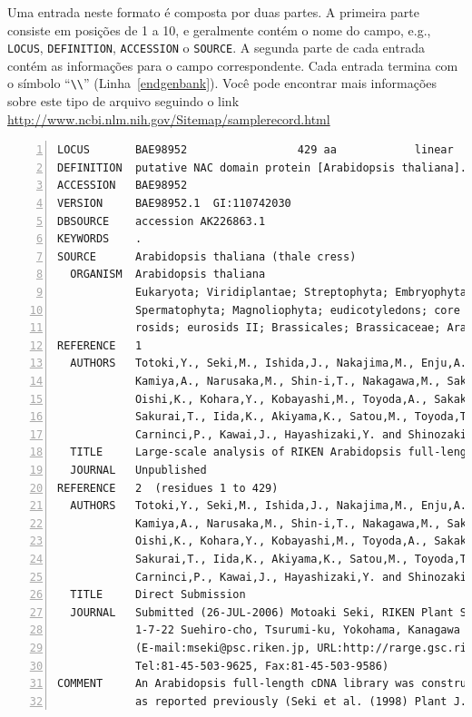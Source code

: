 \documentclass[letter,11pt]{book}
\begin{document}
Uma entrada neste formato é composta por duas partes. A primeira parte consiste em posições de 1 a 10, e geralmente contém o nome do campo, e.g., \Verb+LOCUS+, \Verb+DEFINITION+, \Verb+ACCESSION+ o \Verb+SOURCE+. A segunda parte de cada entrada contém as informações para o campo correspondente. Cada entrada termina com o símbolo ``\Verb+\\+'' (Linha~\ref{endgenbank}). Você pode encontrar mais informações sobre este tipo de arquivo seguindo o link \url{http://www.ncbi.nlm.nih.gov/Sitemap/samplerecord.html}


\begin{Verbatim}[commandchars=!\{\},numbers=left,firstnumber=last,label=Sequência em formato GenBank,frame=topline,fontsize=\tiny]
LOCUS       BAE98952                 429 aa            linear   PLN 27-JUL-2006
DEFINITION  putative NAC domain protein [Arabidopsis thaliana].
ACCESSION   BAE98952
VERSION     BAE98952.1  GI:110742030
DBSOURCE    accession AK226863.1
KEYWORDS    .
SOURCE      Arabidopsis thaliana (thale cress)
  ORGANISM  Arabidopsis thaliana
            Eukaryota; Viridiplantae; Streptophyta; Embryophyta; Tracheophyta;
            Spermatophyta; Magnoliophyta; eudicotyledons; core eudicotyledons;
            rosids; eurosids II; Brassicales; Brassicaceae; Arabidopsis.
REFERENCE   1
  AUTHORS   Totoki,Y., Seki,M., Ishida,J., Nakajima,M., Enju,A., Morosawa,T.,
            Kamiya,A., Narusaka,M., Shin-i,T., Nakagawa,M., Sakamoto,N.,
            Oishi,K., Kohara,Y., Kobayashi,M., Toyoda,A., Sakaki,Y.,
            Sakurai,T., Iida,K., Akiyama,K., Satou,M., Toyoda,T., Konagaya,A.,
            Carninci,P., Kawai,J., Hayashizaki,Y. and Shinozaki,K.
  TITLE     Large-scale analysis of RIKEN Arabidopsis full-length (RAFL) cDNAs
  JOURNAL   Unpublished
REFERENCE   2  (residues 1 to 429)
  AUTHORS   Totoki,Y., Seki,M., Ishida,J., Nakajima,M., Enju,A., Morosawa,T.,
            Kamiya,A., Narusaka,M., Shin-i,T., Nakagawa,M., Sakamoto,N.,
            Oishi,K., Kohara,Y., Kobayashi,M., Toyoda,A., Sakaki,Y.,
            Sakurai,T., Iida,K., Akiyama,K., Satou,M., Toyoda,T., Konagaya,A.,
            Carninci,P., Kawai,J., Hayashizaki,Y. and Shinozaki,K.
  TITLE     Direct Submission
  JOURNAL   Submitted (26-JUL-2006) Motoaki Seki, RIKEN Plant Science Center;
            1-7-22 Suehiro-cho, Tsurumi-ku, Yokohama, Kanagawa 230-0045, Japan
            (E-mail:mseki@psc.riken.jp, URL:http://rarge.gsc.riken.jp/,
            Tel:81-45-503-9625, Fax:81-45-503-9586)
COMMENT     An Arabidopsis full-length cDNA library was constructed essentially
            as reported previously (Seki et al. (1998) Plant J. 15:707-720;

\end{Verbatim}
\end{document}
